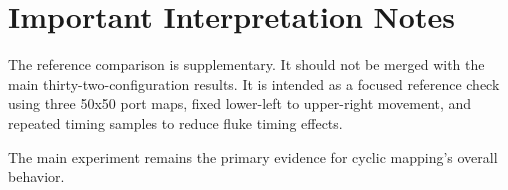 \documentclass[11pt]{article}
\begin{document}
\section{Important Interpretation Notes}

The reference comparison is supplementary. It should not be merged with the main thirty-two-configuration results. It is intended as a focused reference check using three 50x50 port maps, fixed lower-left to upper-right movement, and repeated timing samples to reduce fluke timing effects.

The main experiment remains the primary evidence for cyclic mapping's overall behavior.
\end{document}
